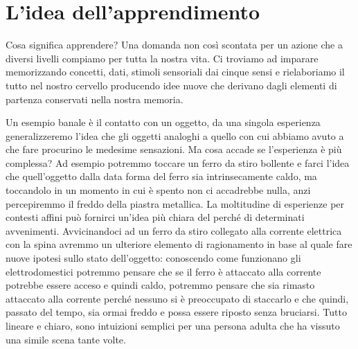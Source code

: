 \section{L'idea dell'apprendimento}
Cosa significa apprendere? Una domanda non così scontata per un azione che a diversi livelli compiamo per tutta la nostra vita. Ci troviamo ad imparare memorizzando concetti, dati, stimoli sensoriali dai cinque sensi e rielaboriamo il tutto nel nostro cervello producendo idee nuove che derivano dagli elementi di partenza conservati nella nostra memoria.

Un esempio banale è il contatto con un oggetto, da una singola esperienza generalizzeremo l'idea che gli oggetti analoghi a quello con cui abbiamo avuto a che fare procurino le medesime sensazioni. Ma cosa accade se l'esperienza è più complessa? Ad esempio potremmo toccare un ferro da stiro bollente e farci l'idea che quell'oggetto dalla data forma del ferro sia intrinsecamente caldo, ma toccandolo in un momento in cui è spento non ci accadrebbe nulla, anzi percepiremmo il freddo della piastra metallica. La moltitudine di esperienze per contesti affini può fornirci un'idea più chiara del perché di determinati avvenimenti. Avvicinandoci ad un ferro da stiro collegato alla corrente elettrica con la spina avremmo un ulteriore elemento di ragionamento in base al quale fare nuove ipotesi sullo stato dell'oggetto: conoscendo come funzionano gli elettrodomestici potremmo pensare che se il ferro è attaccato alla corrente potrebbe essere acceso e quindi caldo, potremmo pensare che sia rimasto attaccato alla corrente perché nessuno si è preoccupato di staccarlo e che quindi, passato del tempo, sia ormai freddo e possa essere riposto senza bruciarsi. Tutto lineare e chiaro, sono intuizioni semplici per una persona adulta che ha vissuto una simile scena tante volte. 
\\

